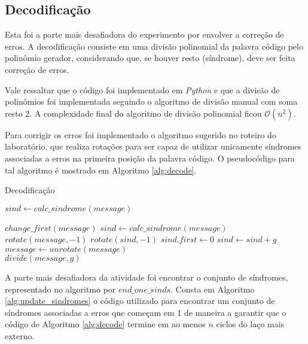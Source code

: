 \subsection{Decodificação}

Esta foi a parte mais desafiadora do experimento por envolver a correção de erros. A decodificação consiste em uma divisão polinomial da palavra código pelo polinômio gerador, considerando que, se houver resto (síndrome), deve ser feita correção de erros.

Vale ressaltar que o código foi implementado em \textit{Python} e que a divisão de polinômios foi implementada seguindo o algoritmo de divisão manual com soma resto 2. A complexidade final do algoritmo de divisão polinomial ficou $\mathcal{O}(n^2)$.

Para corrigir os erros foi implementado o algoritmo sugerido no roteiro do laboratório, que realiza rotações para ser capaz de utilizar unicamente síndromes associadas a erros na primeira posição da palavra código. O pseudocódigo para tal algoritmo é mostrado em Algoritmo \ref{alg:decode}.

\begin{algorithm}
	\caption{Decodificação}\label{alg:decode}
	\begin{algorithmic}[Message]
			\State $sind \gets calc\_sindrome(message)$
			
					\State $change\_first(message)$
					\State $sind \gets calc\_sindrome(message)$
				\Else
				\State $rotate(message, -1)$
				\State $rotate(sind, -1)$
						\State $sind.first \gets 0$
						\State $sind \gets sind+g$
					\EndIf
				\EndIf
			\EndWhile
		\State $message \gets unrotate(message)$\\
		\Return $divide(message, g)$
		\EndProcedure
	\end{algorithmic}
\end{algorithm}

A parte mais desafiadora da atividade foi encontrar o conjunto de síndromes, representado no algoritmo por $end\_one\_sinds$. Consta em Algoritmo \ref{alg:update_sindromes} o código utilizado para encontrar um conjunto de síndromes associadas a erros que começam em 1 de maneira a garantir que o código de Algoritmo \ref{alg:decode} termine em ao menos $n$ ciclos do laço mais externo.

